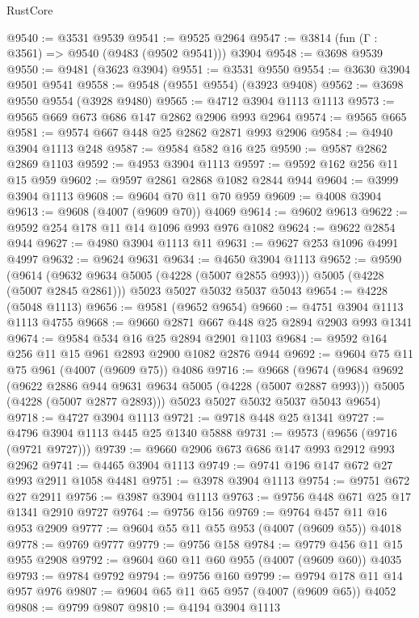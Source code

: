 \begin{lexlean}{RustCore}
\begin{coremodule}
@9540 := @3531 @9539
@9541 := @9525 @2964
@9547 := @3814 (fun (Γ : @3561) => @9540 (@9483 (@9502 @9541))) @3904
@9548 := @3698 @9539
@9550 := @9481 (@3623 @3904)
@9551 := @3531 @9550
@9554 := @3630 @3904 @9501 @9541
@9558 := @9548 (@9551 @9554) (@3923 @9408)
@9562 := @3698 @9550 @9554 (@3928 @9480)
@9565 := @4712 @3904 @1113 @1113
@9573 := @9565 @669 @673 @686 @147 @2862 @2906 @993 @2964
@9574 := @9565 @665
@9581 := @9574 @667 @448 @25 @2862 @2871 @993 @2906
@9584 := @4940 @3904 @1113 @248
@9587 := @9584 @582 @16 @25
@9590 := @9587 @2862 @2869 @1103
@9592 := @4953 @3904 @1113
@9597 := @9592 @162 @256 @11 @15 @959
@9602 := @9597 @2861 @2868 @1082 @2844 @944
@9604 := @3999 @3904 @1113
@9608 := @9604 @70 @11 @70 @959
@9609 := @4008 @3904
@9613 := @9608 (@4007 (@9609 @70)) @4069
@9614 := @9602 @9613
@9622 := @9592 @254 @178 @11 @14 @1096 @993 @976 @1082
@9624 := @9622 @2854 @944
@9627 := @4980 @3904 @1113 @11
@9631 := @9627 @253 @1096 @4991 @4997
@9632 := @9624 @9631
@9634 := @4650 @3904 @1113
@9652 := @9590
    (@9614 (@9632 @9634 @5005 (@4228 (@5007 @2855 @993))) @5005 (@4228 (@5007 @2845 @2861)))
    @5023
    @5027
    @5032
    @5037
    @5043
@9654 := @4228 (@5048 @1113)
@9656 := @9581 (@9652 @9654)
@9660 := @4751 @3904 @1113 @1113 @4755
@9668 := @9660 @2871 @667 @448 @25 @2894 @2903 @993 @1341
@9674 := @9584 @534 @16 @25 @2894 @2901 @1103
@9684 := @9592 @164 @256 @11 @15 @961 @2893 @2900 @1082 @2876 @944
@9692 := @9604 @75 @11 @75 @961 (@4007 (@9609 @75)) @4086
@9716 := @9668
    (@9674
      (@9684
        @9692
        (@9622 @2886 @944 @9631 @9634 @5005 (@4228 (@5007 @2887 @993)))
        @5005
        (@4228 (@5007 @2877 @2893)))
      @5023
      @5027
      @5032
      @5037
      @5043
      @9654)
@9718 := @4727 @3904 @1113
@9721 := @9718 @448 @25 @1341
@9727 := @4796 @3904 @1113 @445 @25 @1340 @5888
@9731 := @9573 (@9656 (@9716 (@9721 @9727)))
@9739 := @9660 @2906 @673 @686 @147 @993 @2912 @993 @2962
@9741 := @4465 @3904 @1113
@9749 := @9741 @196 @147 @672 @27 @993 @2911 @1058 @4481
@9751 := @3978 @3904 @1113
@9754 := @9751 @672 @27 @2911
@9756 := @3987 @3904 @1113
@9763 := @9756 @448 @671 @25 @17 @1341 @2910 @9727
@9764 := @9756 @156
@9769 := @9764 @457 @11 @16 @953 @2909
@9777 := @9604 @55 @11 @55 @953 (@4007 (@9609 @55)) @4018
@9778 := @9769 @9777
@9779 := @9756 @158
@9784 := @9779 @456 @11 @15 @955 @2908
@9792 := @9604 @60 @11 @60 @955 (@4007 (@9609 @60)) @4035
@9793 := @9784 @9792
@9794 := @9756 @160
@9799 := @9794 @178 @11 @14 @957 @976
@9807 := @9604 @65 @11 @65 @957 (@4007 (@9609 @65)) @4052
@9808 := @9799 @9807
@9810 := @4194 @3904 @1113

\end{coremodule}
\end{lexlean}
